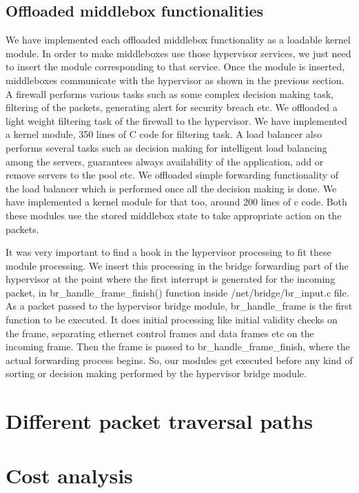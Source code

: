 \documentclass[a4paper,11pt]{report}
\begin{document}
\subsection{Offloaded middlebox functionalities}
We have implemented each offloaded middlebox functionality as a loadable kernel module. In order to make middleboxes use those hypervisor services, we just need to insert the module corresponding to that service. Once the module is inserted, middleboxes communicate with the hypervisor as shown in the previous section. A firewall performs various tasks such as some complex decision making task, filtering of the packets, generating alert for security breach etc. We offloaded a light weight filtering task of the firewall to the hypervisor. We have implemented a kernel module, 350 lines of C code for filtering task. A load balancer also performs several tasks such as decision making for intelligent load balancing among the servers, guarantees always availability of the application, add or remove servers to the pool etc. We offloaded simple forwarding functionality of the load balancer which is performed once all the decision making is done. We have implemented a kernel module for that too, around 200 lines of c code. Both these modules use the stored middlebox state to take appropriate action on the packets.

It was very important to find a hook in the hypervisor processing to fit these module processing. We insert this processing in the bridge forwarding part of the hypervisor at the point where the first interrupt is generated for the incoming packet, in br\_handle\_frame\_finish() function inside /net/bridge/br\_input.c file. As a packet passed to the hypervisor bridge module, br\_handle\_frame is the first function to be executed. It does initial processing like initial validity checks on the frame, separating ethernet control frames and data frames etc on the incoming frame. Then the frame is passed to br\_handle\_frame\_finish, where the actual forwarding process begins. So, our modules get executed before any kind of sorting or decision making performed by the hypervisor bridge module.                          
\section{Different packet traversal paths}

\section{Cost analysis}
\end{document}
